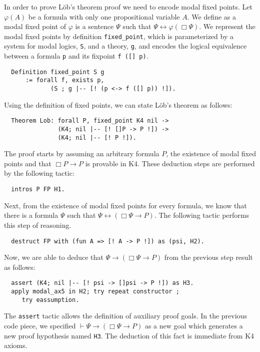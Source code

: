 \documentclass[sigconf,anonymous]{acmart}
\begin{document}
In order to prove L\"ob's theorem proof we need to encode modal
fixed points. Let $\varphi(A)$ be a formula with only one propositional variable
$A$. We define as a modal fixed point of $\varphi$ is a sentence $\Psi$ such that
$\Psi \leftrightarrow \varphi(\Box \Psi)$.
We represent the modal fixed points by definition \texttt{fixed_point},
which is parameterized by a system for modal logics, \texttt{S}, and a
theory, \texttt{g}, and encodes the logical equivalence between a
formula \texttt{p} and its fixpoint \texttt{f ([] p)}. 
\begin{verbatim}
  Definition fixed_point S g
      := forall f, exists p,
             (S ; g |-- [! (p <-> f ([] p)) !]).
\end{verbatim}

\noindent Using the definition of fixed points, we can state L\"ob's theorem as follows:

\begin{verbatim}
  Theorem Lob: forall P, fixed_point K4 nil ->
               (K4; nil |-- [! []P -> P !]) ->
               (K4; nil |-- [! P !]).
\end{verbatim}

\noindent The proof starts by assuming an arbitrary formula $P$, the existence of modal fixed
points and that $\Box P \to P$ is provable in K4. These deduction steps
are performed by the following tactic:

\begin{verbatim}
  intros P FP H1.
\end{verbatim}

\noindent Next, from the existence of modal fixed points for every formula,
we know that there is a formula $\Psi$ such that $\Psi \leftrightarrow (\Box
\Psi \to P)$. The following tactic performs this step of reasoning.

\begin{verbatim}
  destruct FP with (fun A => [! A -> P !]) as (psi, H2).
\end{verbatim}

\noindent Now, we are able to deduce that $\Psi \to (\Box \Psi\to P)$ from the previous
step result as follows:

\begin{verbatim}
  assert (K4; nil |-- [! psi -> []psi -> P !]) as H3.
  apply modal_ax5 in H2; try repeat constructor ;
     try eassumption.
\end{verbatim}

\noindent The \texttt{assert} tactic allows the definition of
auxiliary proof goals. In the previous code piece, we specified
$\vdash \Psi \to (\Box \Psi \to P)$ as a new goal which
generates a new proof hypothesis named \texttt{H3}. The
deduction of this fact is immediate from K4 axioms.
\end{document}
